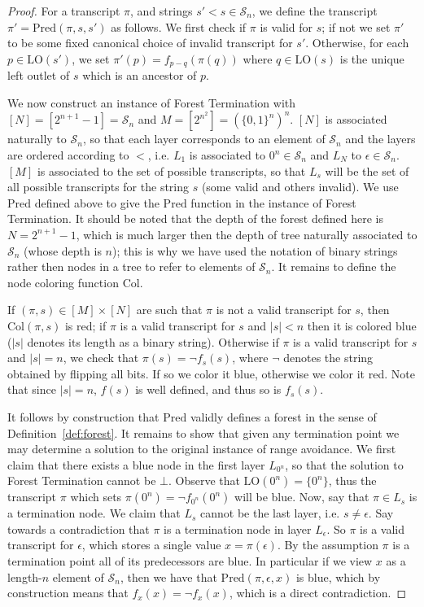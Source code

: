 \documentclass[11pt]{article}
\newcommand{\B}{\{0,1\}}
\begin{document}
\begin{proof}
For a transcript $\pi$, and strings $s' < s \in \mathcal{S}_n$, we define the transcript $\pi' = \mathrm{Pred}(\pi, s, s')$ as follows. We first check if $\pi$ is valid for $s$; if not we set $\pi'$ to be some fixed canonical choice of invalid transcript for $s'$. Otherwise, for each $p \in \mathrm{LO}(s')$, we set $\pi'(p) = f_{p-q}(\pi(q))$ where $q \in \mathrm{LO}(s)$ is the unique left outlet of $s$ which is an ancestor of $p$. 

We now construct an instance of Forest Termination with $[N] = [2^{n+1}-1] = \mathcal{S}_n$ and $M = [2^{n^2}] = (\B^n)^n$. $[N]$ is associated naturally to $\mathcal{S}_n$, so that each layer corresponds to an element of $\mathcal{S}_n$ and the layers are ordered according to $<$, i.e. $L_1$ is associated to $0^n \in \mathcal{S}_n$ and $L_N$ to $\epsilon \in \mathcal{S}_n$. $[M]$ is associated to the set of possible transcripts, so that $L_s$ will be the set of all possible transcripts for the string $s$ (some valid and others invalid). We use $\mathrm{Pred}$ defined above to give the $\mathrm{Pred}$ function in the instance of Forest Termination. It should be noted that the depth of the forest defined here is $N = 2^{n+1}-1$, which is much larger then the depth of tree naturally associated to $\mathcal{S}_n$ (whose depth is $n$); this is why we have used the notation of binary strings rather then nodes in a tree to refer to elements of $\mathcal{S}_n$. It remains to define the node coloring function $\mathrm{Col}$.

If $(\pi,s) \in [M] \times [N]$ are such that $\pi$ is not a valid transcript for $s$, then $\mathrm{Col}(\pi,s)$ is red; if $\pi$ is a valid transcript for $s$ and $|s| < n$ then it is colored blue ($|s|$ denotes its length as a binary string). Otherwise if $\pi$ is a valid transcript for $s$ and $|s|=n$, we check that $\pi(s)= \lnot f_s(s)$, where $\lnot$ denotes the string obtained by flipping all bits. If so we color it blue, otherwise we color it red. Note that since $|s|=n$, $f(s)$ is well defined, and thus so is $f_s(s)$.

It follows by construction that $\mathrm{Pred}$ validly defines a forest in the sense of Definition~\ref{def:forest}. It remains to show that given any termination point we may determine a solution to the original instance of range avoidance. We first claim that there exists a blue node in the first layer $L_{0^n}$, so that the solution to Forest Termination cannot be $\bot$. Observe that $\mathrm{LO}(0^n) = \{0^n\}$, thus the transcript $\pi$ which sets $\pi(0^n) = \lnot f_{0^n}(0^n)$ will be blue. Now, say that $\pi \in L_s$ is a termination node. We claim that $L_s$ cannot be the last layer, i.e. $s \neq \epsilon$. Say towards a contradiction that $\pi$ is a termination node in layer $L_{\epsilon}$. So $\pi$ is a valid transcript for $\epsilon$, which stores a single value $x = \pi(\epsilon)$. By the assumption $\pi$ is a termination point all of its predecessors are blue. In particular if we view $x$ as a length-$n$ element of $\mathcal{S}_n$, then we have that $\mathrm{Pred}(\pi,\epsilon, x)$ is blue, which by construction means that $f_{x}(x) = \lnot f_{x}(x)$, which is a direct contradiction.


\end{proof}
\end{document}
